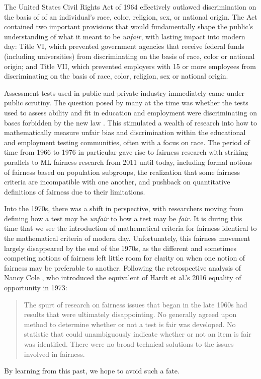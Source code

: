 \documentclass[sigconf,letterpaper,9pt]{acmart}
\begin{document}
The United States Civil Rights Act of 1964 effectively outlawed discrimination on the basis of of an individual's race, color, religion, sex, or national origin.  The Act contained two important provisions that would fundamentally shape the public's understanding of what it meant to be {\em unfair}, with lasting impact into modern day: Title VI, which prevented government agencies that receive federal funds (including universities) from discriminating on the basis of race, color or national origin; and Title VII, which prevented employers with 15 or more employees from discriminating on the basis of race, color, religion, sex or national origin. 

Assessment tests used in public and private industry immediately came under public scrutiny. The question posed by many at the time was whether the tests used to assess ability and fit in education and employment were discriminating on bases forbidden by the new law \cite{ash1966implications}.  This stimulated a wealth of research into how to mathematically measure unfair bias and discrimination
within the educational and employment testing communities, often with a focus on race.
The period of time from 1966 to 1976 in particular gave rise to fairness research with striking parallels to ML fairness research from 2011 until today, including formal notions of fairness based on population subgroups, the realization that some fairness criteria are incompatible with one another,
and pushback on quantitative definitions of fairness due to their limitations.

Into the 1970s, there was a shift in perspective, with researchers moving from defining how a test may be {\em unfair} to how a test may be {\em fair}.  It is during this time that we see the introduction of mathematical criteria for fairness identical to the mathematical criteria of modern day.  Unfortunately, this fairness movement largely disappeared by the end of the 1970s, as the different and sometimes competing notions of fairness left little room for clarity on when one notion of fairness may be preferable to another.  Following the retrospective analysis of Nancy Cole \cite{cole2001new}, who introduced the equivalent of Hardt et al.'s 2016 equality of opportunity \cite{Hardtetal2016equality} in 1973: 
\vspace{-1em}
\begin{quote}
\fontsize{8.5}{10}\selectfont
The spurt of research on fairness issues that began in the late 1960s had results that were ultimately disappointing. No generally
agreed upon method to determine whether or not a test is fair was developed. No
statistic that could unambiguously indicate whether or not an item is fair was
identified. There were no broad technical solutions to the issues involved in
fairness. 
\end{quote}
%
\vspace{-.1em}
By learning from this past, we hope to avoid such a fate.
\end{document}
